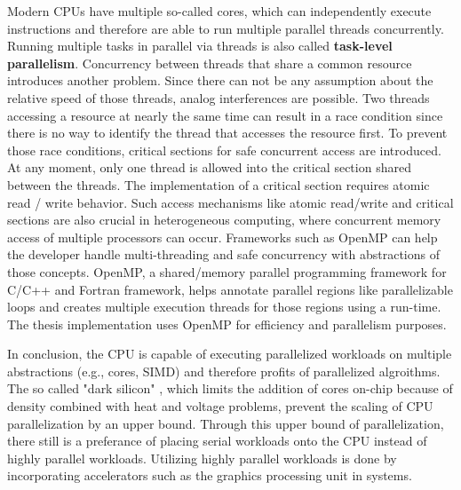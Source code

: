 Modern CPUs have multiple so-called cores, which can independently execute instructions and therefore are able to run multiple parallel threads concurrently. Running multiple tasks in parallel via threads is also called \textbf{task-level parallelism}.
Concurrency between threads that share a common resource introduces another problem. Since there can not be any assumption about the relative speed of those threads, analog interferences are possible. Two threads accessing a resource at nearly the same time can result in a race condition since there is no way to identify the thread that accesses the resource first. To prevent those race conditions, critical sections for safe concurrent access are introduced. At any moment, only one thread is allowed into the critical section shared between the threads. The implementation of a critical section requires atomic read / write behavior.
Such access mechanisms like atomic read/write and critical sections are also crucial in heterogeneous computing, where concurrent memory access of multiple processors can occur.
Frameworks such as OpenMP can help the developer handle multi-threading and safe concurrency with abstractions of those concepts. OpenMP, a shared/memory parallel programming framework for C/C++ and Fortran framework, helps annotate parallel regions like parallelizable loops and creates multiple execution threads for those regions using a run-time.
The thesis implementation uses OpenMP for efficiency and parallelism purposes.

In conclusion, the CPU is capable of executing parallelized workloads on multiple abstractions (e.g., cores, SIMD) and therefore profits of parallelized algroithms. The so called "dark silicon" \cite{esmaeilzadehDarkSiliconEnd2011}, which limits the addition of cores on-chip because of density combined with heat and voltage problems, prevent the scaling of CPU parallelization by an upper bound. Through this upper bound of parallelization, there still is a preferance of placing serial workloads onto the CPU instead of highly parallel workloads. Utilizing highly parallel workloads is done by incorporating accelerators such as the graphics processing unit in systems.

